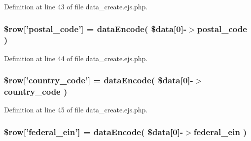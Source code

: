 \-Definition at line 43 of file data\-\_\-create.\-ejs.\-php.

\hypertarget{patientfile_2immnunization_2data__create_8ejs_8php_ad7806756ac25ee8772f6b02f00d601b7}{
\subsubsection[{\$row}]{\setlength{\rightskip}{0pt plus 5cm}\$row\mbox{[}'postal\-\_\-code'\mbox{]} = {\bf data\-Encode}( \$data\mbox{[}0\mbox{]}-\/$>$postal\-\_\-code )}}\label{patientfile_2immnunization_2data__create_8ejs_8php_ad7806756ac25ee8772f6b02f00d601b7}


\-Definition at line 44 of file data\-\_\-create.\-ejs.\-php.

\hypertarget{patientfile_2immnunization_2data__create_8ejs_8php_a7c5128fc922226763e03d46ff4b7a35e}{
\subsubsection[{\$row}]{\setlength{\rightskip}{0pt plus 5cm}\$row\mbox{[}'country\-\_\-code'\mbox{]} = {\bf data\-Encode}( \$data\mbox{[}0\mbox{]}-\/$>$country\-\_\-code )}}\label{patientfile_2immnunization_2data__create_8ejs_8php_a7c5128fc922226763e03d46ff4b7a35e}


\-Definition at line 45 of file data\-\_\-create.\-ejs.\-php.

\hypertarget{patientfile_2immnunization_2data__create_8ejs_8php_ab89a458f1e0bf0241b5dbb11f14f56e3}{
\subsubsection[{\$row}]{\setlength{\rightskip}{0pt plus 5cm}\$row\mbox{[}'federal\-\_\-ein'\mbox{]} = {\bf data\-Encode}( \$data\mbox{[}0\mbox{]}-\/$>$federal\-\_\-ein )}}\label{patientfile_2immnunization_2data__create_8ejs_8php_ab89a458f1e0bf0241b5dbb11f14f56e3}



